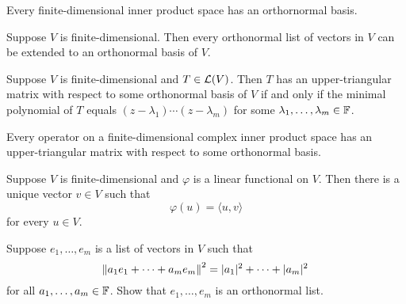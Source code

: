 \documentclass{extarticle}
\begin{document}
\begin{corollary}
    Every finite-dimensional inner product space has an orthornormal basis.
\end{corollary}

\begin{corollary}
    Suppose \(V\) is finite-dimensional. Then every orthonormal list of vectors in \(V\) can 
    be extended to an orthonormal basis of \(V\).
\end{corollary}

\begin{lemma}
    Suppose \(V\) is finite-dimensional and \(T \in \mathcal{L}(V)\). Then \(T\) has an upper-triangular matrix 
    with respect to some orthonormal basis of \(V\) if and only if the minimal polynomial of \(T\) equals 
    \((z - \lambda_1) \cdots (z - \lambda_m)\) for some \(\lambda_1, \ldots, \lambda_m \in \mathbb{F}\).
\end{lemma}

\begin{thm}
    Every operator on a finite-dimensional complex inner product space has an upper-triangular matrix 
    with respect to some orthonormal basis.
\end{thm}

\begin{thm}
    Suppose \(V\) is finite-dimensional and \(\varphi\) is a linear functional on \(V\). Then there 
    is a unique vector \(v \in V\) such that 
    \[\varphi(u) = \langle u,v \rangle\]
    for every \(u \in V\).
\end{thm}





\newpage 
{}


\begin{problem}{1}
    Suppose \(e_1, \ldots, e_m\) is a list of vectors in \(V\) such that 
    \[\norm{a_1 e_1 + \cdots + a_m e_m}^2 = |a_1|^2 + \cdots + |a_m|^2\]
    for all \(a_1, \ldots, a_m \in \mathbb{F}\). Show that \(e_1, \ldots, e_m\) is an orthonormal list.
\end{problem}
\end{document}
